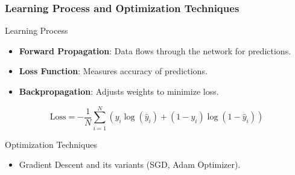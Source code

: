 \documentclass[aspectratio=169]{beamer}
\begin{document}
\begin{frame}[fragile]
    \frametitle{Learning Process and Optimization Techniques}
    
    \begin{block}{Learning Process}
        \begin{itemize}
            \item \textbf{Forward Propagation}: Data flows through the network for predictions.
            \item \textbf{Loss Function}: Measures accuracy of predictions.
            \item \textbf{Backpropagation}: Adjusts weights to minimize loss.
        \end{itemize}
        \begin{equation}
            \text{Loss} = -\frac{1}{N} \sum_{i=1}^{N} \left(y_i \log(\hat{y}_i) + (1 - y_i) \log(1 - \hat{y}_i)\right)
        \end{equation}
    \end{block}
    
    \begin{block}{Optimization Techniques}
        \begin{itemize}
            \item Gradient Descent and its variants (SGD, Adam Optimizer).
        \end{itemize}
    \end{block}
\end{frame}
\end{document}
